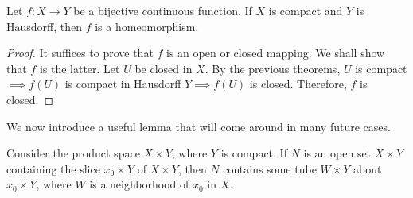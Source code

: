     \begin{theorem}
    Let $f: X \longrightarrow Y$ be a bijective continuous function. If $X$ is compact and $Y$ is Hausdorff, then $f$ is a homeomorphism. 
    \end{theorem}
    \begin{proof}
    It suffices to prove that $f$ is an open or closed mapping. We shall show that $f$ is the latter. Let $U$ be closed in $X$. By the previous theorems, $U$ is compact $\implies f(U)$ is compact in Hausdorff $Y \implies f(U)$ is closed. Therefore, $f$ is closed. 
    \end{proof}

    We now introduce a useful lemma that will come around in many future cases. 

    \begin{lemma}
    Consider the product space $X \times Y$, where $Y$ is compact. If $N$ is an open set $X \times Y$ containing the slice $x_0 \times Y$ of $X \times Y$, then $N$ contains some tube $W \times Y$ about $x_0 \times Y$, where $W$ is a neighborhood of $x_0$ in $X$. 
    \end{lemma}
    \begin{center}
    \end{center}
